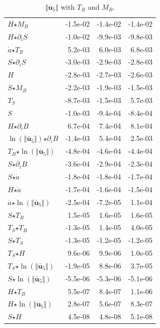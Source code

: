 \begin{table}[H]
\begin{tabular}{l|r|r|r}
  $H$$ \star $$M_B$ & -1.5e-02 & -1.4e-02 & -1.4e-02 \\
  $H$$ \star $$\partial_i S$ & -1.0e-02 & -9.9e-03 & -9.8e-03 \\
  $\dot{a}$$ \star $$T_B$ & 5.2e-03 & 6.0e-03 & 6.8e-03 \\
  $S$$ \star $$\partial_i S$ & -3.0e-03 & -2.9e-03 & -2.8e-03 \\
  $H$ & -2.8e-03 & -2.7e-03 & -2.6e-03 \\
  $S$$ \star $$M_B$ & -2.2e-03 & -1.9e-03 & -1.5e-03 \\
  \color{red}$T_S$ & \color{red}-8.7e-03 & \color{red}-1.5e-03 & \color{red}5.7e-03 \\
  $S$ & -1.0e-03 & -9.4e-04 & -8.4e-04 \\
  $H$$ \star $$\partial_i B$ & 6.7e-04 & 7.4e-04 & 8.1e-04 \\
  \color{red}$\ln\left( \Vert \bar{\mathbf{u}}_{5} \Vert \right)$$ \star $$\partial_i B$ & \color{red}-1.4e-03 & \color{red}5.4e-04 & \color{red}2.5e-03 \\
  $T_B$$ \star $$\ln\left( \Vert \bar{\mathbf{u}}_{5} \Vert \right)$ & -4.8e-04 & -4.6e-04 & -4.4e-04 \\
  $S$$ \star $$\partial_i B$ & -3.6e-04 & -2.9e-04 & -2.3e-04 \\
  $S$$ \star $$\dot{a}$ & -1.8e-04 & -1.8e-04 & -1.7e-04 \\
  $H$$ \star $$\dot{a}$ & -1.7e-04 & -1.6e-04 & -1.5e-04 \\
  \color{red}$\dot{a}$$ \star $$\ln\left( \Vert \bar{\mathbf{u}}_{5} \Vert \right)$ & \color{red}-2.5e-04 & \color{red}-7.2e-05 & \color{red}1.1e-04 \\
  $S$$ \star $$T_B$ & 1.5e-05 & 1.6e-05 & 1.6e-05 \\
  \color{red}$T_S$$ \star $$T_B$ & \color{red}-1.3e-05 & \color{red}1.4e-05 & \color{red}4.0e-05 \\
  $S$$ \star $$T_S$ & -1.3e-05 & -1.2e-05 & -1.2e-05 \\
  $T_S$$ \star $$H$ & 9.6e-06 & 9.9e-06 & 1.0e-05 \\
  \color{red}$T_S$$ \star $$\ln\left( \Vert \bar{\mathbf{u}}_{5} \Vert \right)$ & \color{red}-1.9e-05 & \color{red}8.8e-06 & \color{red}3.7e-05 \\
  $S$$ \star $$\ln\left( \Vert \bar{\mathbf{u}}_{5} \Vert \right)$ & -5.5e-06 & -5.3e-06 & -5.1e-06 \\
  $H$$ \star $$T_B$ & 5.5e-07 & 8.4e-07 & 1.1e-06 \\
  $H$$ \star $$\ln\left( \Vert \bar{\mathbf{u}}_{5} \Vert \right)$ & 2.8e-07 & 5.6e-07 & 8.3e-07 \\
  $S$$ \star $$H$ & 4.5e-08 & 4.8e-08 & 5.1e-08 \\
\end{tabular}
  \caption[]{\normalsize $\Vert \mathbf{\bar{u}}_5 \Vert$ with $T_B$ and $M_B$.}
\end{table}

